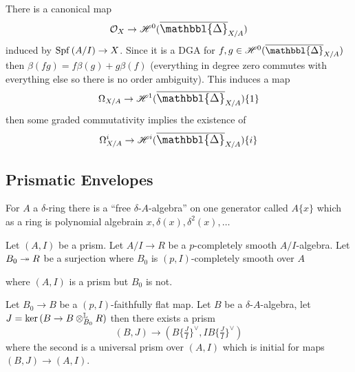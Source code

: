\documentclass[12pt]{article}
\newcommand{\Prism}{{\mathlarger{\mathbbl{\Delta}}}}
\begin{document}
There is a canonical map
\[ \struct{X} \to \H^0(\ol{\Prism}_{X/A}) \]
induced by $\mathrm{Spf}\left( A/I \right) \to X$. Since it is a DGA for $f,g \in \H^0(\ol{\Prism}_{X/A})$ then $\beta(fg) = f \beta(g) + g \beta(f)$ (everything in degree zero commutes with everything else so there is no order ambiguity). This induces a map
\[ \Omega_{X/A} \to \H^1(\ol{\Prism}_{X/A}) \{ 1 \} \]
then some graded commutativity implies the existence of 
\[ \Omega^i_{X/A} \to \H^i(\ol{\Prism}_{X/A}) \{ i \} \]

\subsection{Prismatic Envelopes}

\begin{lemma}
For $A$ a $\delta$-ring there is a ``free $\delta$-$A$-algebra'' on one generator called $A \{ x \}$ which as a ring is polynomial algebrain $x, \delta(x), \delta^2(x), \dots$
\end{lemma}

\begin{prop}
Let $(A, I)$ be a prism. Let $A/I \to R$ be a $p$-completely smooth $A/I$-algebra. Let $B_0 \twoheadrightarrow R$ be a surjection where $B_0$ is $(p,I)$-completely smooth over $A$ 

\begin{center}
\end{center}
where $(A, I)$ is a prism but $B_0$ is not. 

Let $B_0 \to B$ be a $(p, I)$-faithfully flat map. Let $B$ be a $\delta$-$A$-algebra, let $J = \ker{(B \to B \otimes_{B_0}^{\mathbb{L}} R)}$ then there exists a prism
\[ (B, J) \to (B \{ \tfrac{J}{I} \}^{\vee}, I B \{ \tfrac{J}{I} \}^{\vee}) \]
where the second is a universal prism over $(A, I)$ which is initial for maps $(B, J) \to (A,I)$.
\end{prop}
\end{document}
